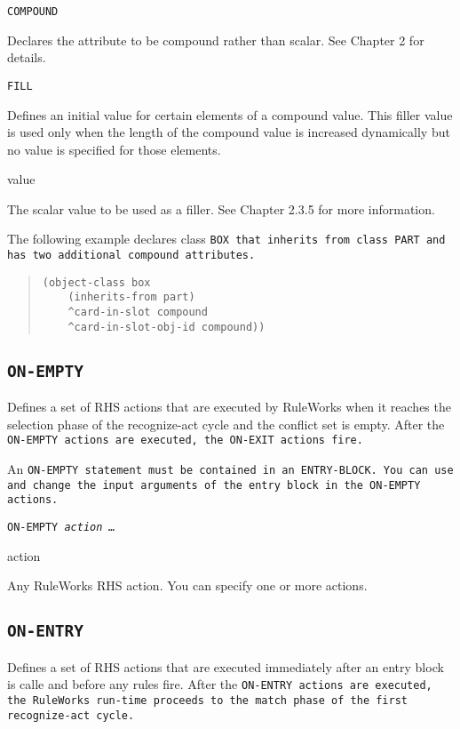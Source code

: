 {{\tt{COMPOUND}

Declares the attribute to be compound rather than scalar. See
Chapter 2 for details.

\tt{FILL}

Defines an initial value for certain elements of a compound
value. This filler value is used only when the length of the
compound value is increased dynamically but no value is
specified for those elements.

value

The scalar value to be used as a filler. See Chapter 2.3.5
for more information.

\Example

The following example declares class \tt{BOX} that inherits from
class \tt{PART} and has two additional compound attributes.

\begin{quote}
\begin{verbatim}
(object-class box
    (inherits-from part)
    ^card-in-slot compound
    ^card-in-slot-obj-id compound))
\end{verbatim}
\end{quote}

\subsection{\tt{ON-EMPTY}}

Defines a set of RHS actions that are executed by RuleWorks
when it reaches the selection phase of the recognize-act
cycle and the conflict set is empty. After the \tt{ON-EMPTY}
actions are executed, the \tt{ON-EXIT} actions fire.

An \tt{ON-EMPTY} statement must be contained in an \tt{ENTRY-BLOCK}.
You can use and change the input arguments of the entry block
in the \tt{ON-EMPTY} actions.

\Format

\tt{ON-EMPTY} \it{action} \ldots

\begin{arguments}
\item[action]

  Any RuleWorks RHS action. You can specify one or more actions.
\end{arguments}

\subsection{\tt{ON-ENTRY}}

Defines a set of RHS actions that are executed immediately
after an entry block is calle and before any rules fire.
After the \tt{ON-ENTRY} actions are executed, the RuleWorks
run-time proceeds to the match phase of the first
recognize-act cycle.

}}
